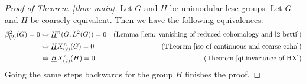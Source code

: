 \documentclass[10pt]{amsart}
\theoremstyle{plain}
\theoremstyle{definition}
\theoremstyle{remark}
\begin{document}
\begin{proof}[Proof of Theorem~\ref{thm: main}]
Let $G$ and $H$ be unimodular lcsc groups. Let $G$ and $H$ be coarsely equivalent. Then we have the following equivalences:
\begin{align*}
\beta_{(2)}^2(G)=0&\Leftrightarrow\underline{H}^n(G,L^2(G))=0 &(\text{Lemma }\ref{lem: vanishing of reduced cohomology and l2 betti})\\
&\Leftrightarrow \underline{H}X_{(2)}^n(G)=0 &(\text{Theorem }\ref{iso of continuous and coarse coho}) \\
&\Leftrightarrow \underline{H}X_{(2)}^n(H)=0 &(\text{Theorem }\ref{qi invariance of HX})
\end{align*}
Going the same steps backwards for the group $H$ finishes the proof. 
\end{proof}
\end{document}
